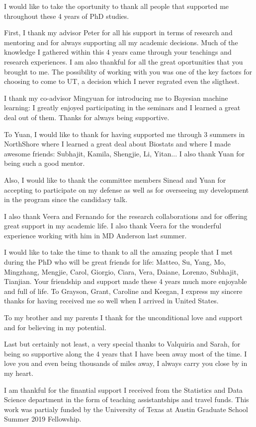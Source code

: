 \documentclass[12pt]{report}	%
\theoremstyle{definition}
\theoremstyle{remark}
\begin{document}
\begin{acknowledgments}		%
%
I would like to take the oportunity to thank all people that supported me throughout these 4 years of PhD studies.

First, I thank my advisor Peter for all his support in terms of research and mentoring and for always supporting all my academic decisions. Much of the knowledge I gathered within this 4 years came through your teachings and research experiences. I am also thankful for all the great oportunities that you brought to me. The possibility of working with you was one of the key factors for choosing to come to UT, a decision which I never regrated even the sligthest.

I thank my co-advisor Mingyuan for introducing me to Bayesian machine learning: I greatly enjoyed participating in the seminars and I learned a great deal out of them. Thanks for always being supportive.

To Yuan, I would like to thank for having supported me through 3 summers in NorthShore where I learned a great deal about Biostats and where I made awesome friends: Subhajit, Kamila, Shengjie, Li, Yitan... I also thank Yuan for being such a good mentor.

Also, I would like to thank the committee members Sinead and Yuan for accepting to participate on my defense as well as for overseeing my development in the program since the candidacy talk.

I also thank Veera and Fernando for the research collaborations and for offering great support in my academic life. I also thank Veera for the wonderful experience working with him in MD Anderson last summer.

I would like to take the time to thank to all the amazing people that I met during the PhD who will be great friends for life: Matteo, Su, Yang, Mo, Mingzhang, Mengjie, Carol, Giorgio, Ciara, Vera, Daiane, Lorenzo, Subhajit, Tianjian. Your friendship and support made these 4 years much more enjoyable and full of life. To Grayson, Grant, Caroline and Keegan, I express my sincere thanks for having received me so well when I arrived in United States.

To my brother and my parents I thank for the unconditional love and support and for believing in my potential.

Last but certainly not least, a very special thanks to Valquiria and Sarah, for being so supportive along the 4 years that I have been away most of the time. I love you and even being thousands of miles away, I always carry you close by in my heart.

I am thankful for the finantial support I received from the Statistics and Data Science department in the form of teaching assistantships and travel funds. This work was partialy funded by the University of Texas at Austin Graduate School Summer 2019 Fellowship.


\end{acknowledgments}
\end{document}
